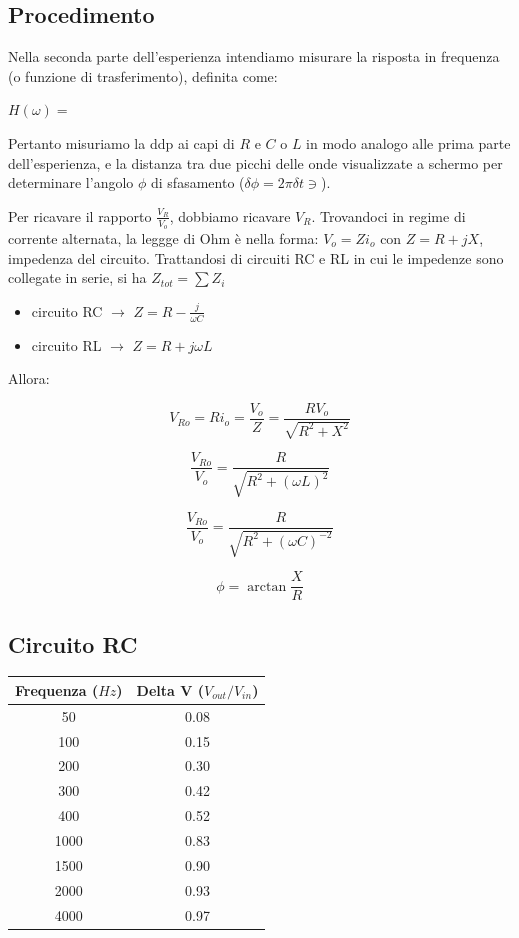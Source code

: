 \subsection{Procedimento}
Nella seconda parte dell'esperienza intendiamo misurare la risposta in frequenza (o funzione di trasferimento), definita come:

$H\left(\omega \right) = $  


Pertanto misuriamo la ddp ai capi di $R$ e $C$ o $L$ in modo analogo alle prima parte dell'esperienza, e la distanza tra due picchi delle onde visualizzate a schermo per determinare l'angolo $\phi$ di sfasamento ($\delta \phi = 2 \pi \delta t \ni$).

Per ricavare il rapporto $\frac{V_{R}}{V_{o}}$, dobbiamo ricavare $V_R$. Trovandoci in regime di corrente alternata, la leggge di Ohm è nella forma: $ V_o = Zi_o$ con $Z = R + jX$, impedenza del circuito.
Trattandosi di circuiti RC e RL in cui le impedenze sono collegate in serie, si ha $Z_{tot} = \sum Z_i$

\begin{itemize}
\item circuito RC $\rightarrow$ $Z=R-\frac{j}{\omega C}$
\item circuito RL $\rightarrow$ $Z=R+j\omega L$
\end{itemize}  

Allora: 

$$V_{Ro} = Ri_o = \frac{V_o}{Z} = \frac{RV_o}{\sqrt{R^2+X^2}} $$ 

$$\frac{V_{Ro}}{V_o} = \frac{R}{\sqrt{R^2+(\omega L)^2}}$$

$$\frac{V_{Ro}}{V_o} = \frac{R}{\sqrt{R^2+(\omega C)^{-2}}}$$

$$\phi = \arctan \frac{X}{R} $$



\subsection{Circuito RC}


\begin{center}
\begin{tabular}{*{2}{c}}
Frequenza ($Hz$) & Delta V ($V_{out}/V_{in}$) \\
\midrule
50 & 0.08 \\
100 & 0.15 \\
200 & 0.30 \\
300 & 0.42 \\
400 & 0.52 \\
1000 & 0.83 \\
1500 & 0.90 \\
2000 & 0.93 \\
4000 & 0.97 \\
\end{tabular}
\end{center}

